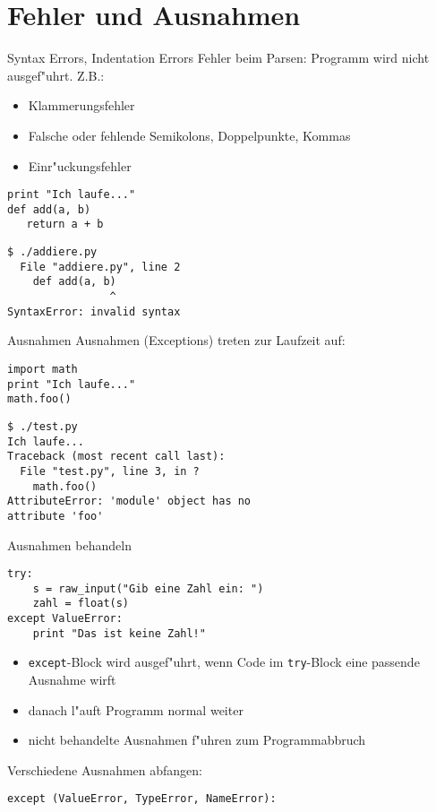 \section{Fehler und Ausnahmen}

\begin{frame}[fragile]{Syntax Errors, Indentation Errors}
Fehler beim Parsen: \alert{Programm wird nicht ausgef"uhrt}. Z.B.: 
\begin{itemize}
\item Klammerungsfehler
\item Falsche oder fehlende Semikolons, Doppelpunkte, Kommas
\item Einr"uckungsfehler
\end{itemize}
\begin{lstlisting}[style=Python]
print "Ich laufe..."
def add(a, b)
   return a + b
\end{lstlisting}
\begin{lstlisting}[style=Shell]
$ ./addiere.py
  File "addiere.py", line 2
    def add(a, b)
                ^
SyntaxError: invalid syntax
\end{lstlisting} %
\end{frame}

\begin{frame}[fragile]{Ausnahmen}
Ausnahmen (Exceptions) treten \alert{zur Laufzeit} auf:
\begin{lstlisting}[style=Python]
import math
print "Ich laufe..."
math.foo()
\end{lstlisting}
\begin{lstlisting}[style=Shell]
$ ./test.py
Ich laufe...
Traceback (most recent call last):
  File "test.py", line 3, in ?
    math.foo()
AttributeError: 'module' object has no 
attribute 'foo'
\end{lstlisting} %
\end{frame}

\begin{frame}[fragile]{Ausnahmen behandeln}
\begin{lstlisting}[style=Python]
try:
    s = raw_input("Gib eine Zahl ein: ")
    zahl = float(s)
except ValueError:
    print "Das ist keine Zahl!"
\end{lstlisting}
\begin{itemize}
\item \lstinline{except}-Block wird ausgef"uhrt, wenn Code im \lstinline{try}-Block eine passende Ausnahme wirft
\item danach l"auft Programm normal weiter
\item nicht behandelte Ausnahmen f"uhren zum Programmabbruch
\end{itemize}
Verschiedene Ausnahmen abfangen:
\begin{lstlisting}[style=Python]
except (ValueError, TypeError, NameError):
\end{lstlisting}
\end{frame}

